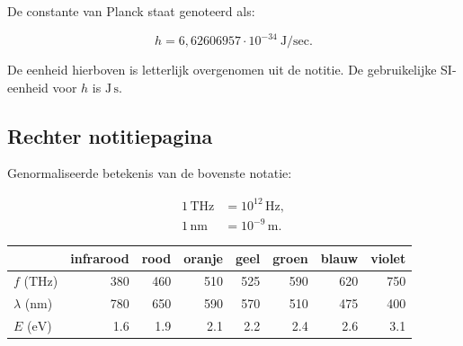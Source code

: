 \documentclass[11pt,a4paper]{article}
\begin{document}
De constante van Planck staat genoteerd als:

$$
h=6{,}62606957\cdot10^{-34}\ \mathrm{J/sec}.
$$

\noindent
De eenheid hierboven is letterlijk overgenomen uit de notitie.
De gebruikelijke SI-eenheid voor $h$ is $\mathrm{J\,s}$.

\subsection*{Rechter notitiepagina}

Genormaliseerde betekenis van de bovenste notatie:

\begin{align*}
1\,\mathrm{THz} &= 10^{12}\,\mathrm{Hz},\\
1\,\mathrm{nm}  &= 10^{-9}\,\mathrm{m}.
\end{align*}

\begin{center}
\small
\begin{tabular}{lrrrrrrr}
\toprule
 & infrarood & rood & oranje & geel & groen & blauw & violet\\
\midrule
$f$ ($\mathrm{THz}$)       & 380 & 460 & 510 & 525 & 590 & 620 & 750\\
$\lambda$ ($\mathrm{nm}$)  & 780 & 650 & 590 & 570 & 510 & 475 & 400\\
$E$ ($\mathrm{eV}$)        & 1.6 & 1.9 & 2.1 & 2.2 & 2.4 & 2.6 & 3.1\\
\bottomrule
\end{tabular}
\end{center}

\begin{center}
\end{center}
\end{document}
